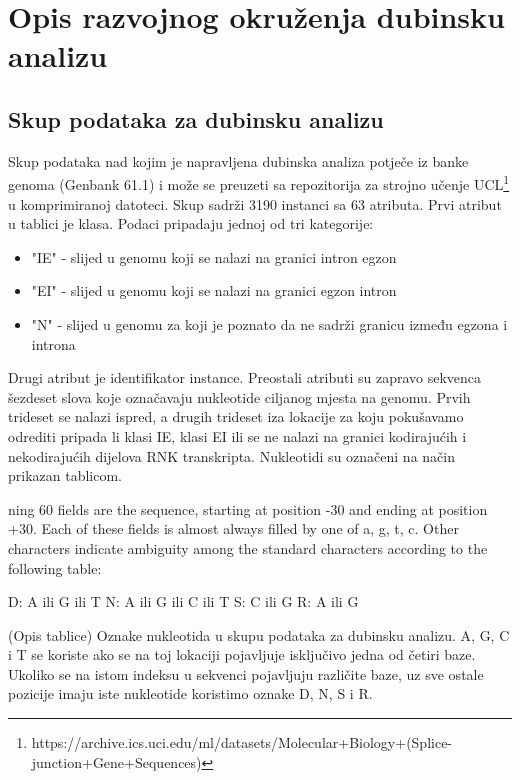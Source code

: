 \section{Opis razvojnog okruženja dubinsku analizu}
\label{ch:ch2}

\subsection{Skup podataka za dubinsku analizu}

Skup podataka nad kojim je napravljena dubinska analiza potječe iz banke genoma
(Genbank 61.1) i može se preuzeti sa repozitorija za strojno učenje UCL\footnote
{https://archive.ics.uci.edu/ml/datasets/Molecular+Biology+(Splice-junction+Gene+Sequences)}
u komprimiranoj datoteci. Skup sadrži 3190 instanci sa 63 atributa.
Prvi atribut u tablici je klasa. Podaci pripadaju jednoj od tri kategorije:
\begin{itemize}
   \item "IE" - slijed u genomu koji se nalazi na granici intron egzon
   \item "EI" - slijed u genomu koji se nalazi na granici egzon intron
   \item "N" - slijed u genomu za koji je poznato da ne sadrži granicu između egzona i introna
\end{itemize}
Drugi atribut je identifikator instance.
Preostali atributi su zapravo sekvenca šezdeset slova koje označavaju nukleotide
ciljanog mjesta na genomu. Prvih trideset se nalazi ispred, a drugih trideset iza
lokacije za koju pokušavamo odrediti pripada li klasi IE, klasi EI ili se ne nalazi
na granici kodirajućih i nekodirajućih dijelova RNK transkripta. Nukleotidi su
označeni na način prikazan tablicom.





ning 60 fields are the sequence, starting at position -30 and ending at position +30. Each of these fields is almost always filled by one of {a, g, t, c}. Other characters indicate ambiguity among the standard characters according to the following table: 

D: A ili G ili T 
N: A ili G ili C ili T 
S: C ili G
R: A ili G

(Opis tablice) Oznake nukleotida u skupu podataka za dubinsku analizu. A, G, C i T se koriste ako se na toj lokaciji pojavljuje isključivo jedna
od četiri baze. Ukoliko se na istom indeksu u sekvenci pojavljuju različite baze, uz sve ostale pozicije imaju iste nukleotide koristimo oznake
D, N, S i R.
